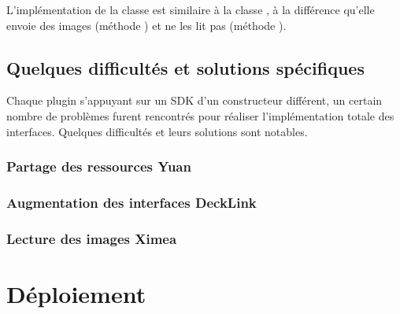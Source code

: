 L'implémentation de la classe  est similaire à la classe ,
à la différence qu'elle envoie des images (méthode ) et ne les lit pas (méthode ).\\
\newline

\subsection{Quelques difficultés et solutions spécifiques}
Chaque plugin s'appuyant sur un SDK d'un constructeur différent, un certain nombre
de problèmes furent rencontrés pour réaliser l'implémentation totale des interfaces.
Quelques difficultés et leurs solutions sont notables.\\

\subsubsection{Partage des ressources Yuan}

\subsubsection{Augmentation des interfaces DeckLink}

\subsubsection{Lecture des images Ximea}


\section{Déploiement}
